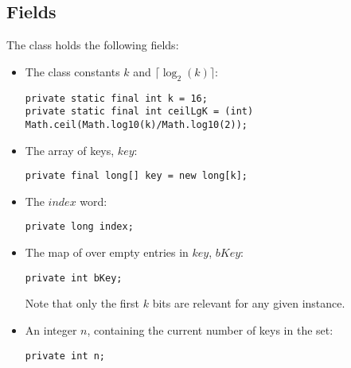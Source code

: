 \subsection{Fields} \label{sec:binaryRankFields}
The class holds the following fields:
\begin{itemize}
    \item
    The class constants $k$ and $\lceil \log_2(k) \rceil$:
    \begin{lstlisting}
private static final int k = 16;
private static final int ceilLgK = (int) Math.ceil(Math.log10(k)/Math.log10(2));
    \end{lstlisting}

    \item
    The array of keys, $key$:
    \begin{lstlisting}
private final long[] key = new long[k];
    \end{lstlisting}
    
    \item
    The $index$ word:
    \begin{lstlisting}
private long index;
    \end{lstlisting}

    \item
    The map of over empty entries in $key$, $bKey$:
    \begin{lstlisting}
private int bKey;
    \end{lstlisting}
    Note that only the first $k$ bits are relevant for any given instance.
    
    \item
    An integer $n$, containing the current number of keys in the set:
    \begin{lstlisting}
private int n;
    \end{lstlisting}
\end{itemize}

